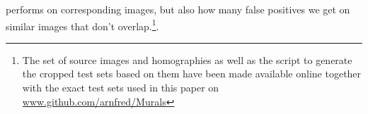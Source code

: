 \documentclass[12pt,journal,compsoc]{IEEEtran}
\begin{document}
performs on corresponding images, but also how many false positives we 
get on similar images that don't overlap.\footnote{The set of source 
	images and homographies as well as the script to generate the 
cropped test sets based on them have been made available online together 
with the exact test sets used in this paper on 
\href{https://github.com/arnfred/Murals}{www.github.com/arnfred/Murals}}.
%
%
\begin{figure}
\end{figure}
\end{document}
